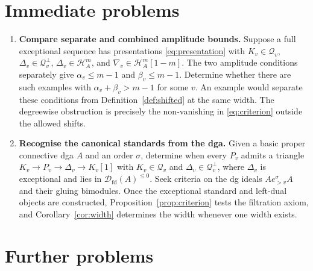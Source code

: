 \documentclass[11pt,a4paper]{article}
\newcommand{\D}{\mathcal D}
\renewcommand{\H}{\mathcal H}
\newcommand{\std}{\Delta}
\newcommand{\costd}{\nabla}
\DeclareMathOperator{\fd}{fd}
\theoremstyle{plain}
\theoremstyle{definition}
\numberwithin{equation}{section}
\begin{document}
\section{Immediate problems}\label{sec:immediate}

\begin{enumerate}[label=\textbf{U\arabic*.},ref=U\arabic*]
\item\label{prob:comparison}
\textbf{Compare separate and combined amplitude bounds.}
Suppose a full exceptional sequence has presentations
\eqref{eq:presentation} with
$K_v\in\mathcal Q_v$, $\std_v\in\mathcal Q_v^\perp$,
$\std_v\in\H_A^m$, and $\costd_v\in\H_A^m[1-m]$.
The two amplitude conditions separately give
$\alpha_v\leq m-1$ and $\beta_v\leq m-1$.
Determine whether there are such examples with
$\alpha_v+\beta_v>m-1$ for some $v$.
An example would separate these conditions from
Definition~\ref{def:shifted} at the same width.
The degreewise obstruction is precisely the non-vanishing in
\eqref{eq:criterion} outside the allowed shifts.

\item\label{prob:recognition}
\textbf{Recognise the canonical standards from the dga.}
Given a basic proper connective dga $A$ and an order $\sigma$,
determine when every $P_v$ admits a triangle
$K_v\to P_v\to\std_v\to K_v[1]$ with
$K_v\in\mathcal Q_v$ and $\std_v\in\mathcal Q_v^\perp$,
where $\std_v$ is exceptional and lies in $\D_{\fd}(A)^{\leq0}$.
Seek criteria on the dg ideals $Ae_{>v}^\sigma A$ and their gluing
bimodules. Once the exceptional standard and left-dual objects
are constructed, Proposition~\ref{prop:criterion} tests the
filtration axiom, and Corollary~\ref{cor:width} determines the width
whenever one width exists.
\end{enumerate}

\section{Further problems}\label{sec:further}
\end{document}
